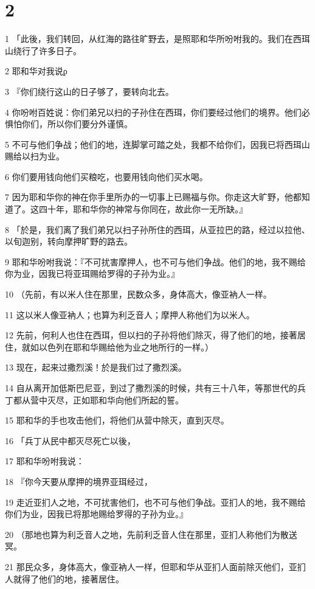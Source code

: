 \chapter{2}

\par 1 「此後，我们转回，从红海的路往旷野去，是照耶和华所吩咐我的。我们在西珥山绕行了许多日子。
\par 2 耶和华对我说ϼ
\par 3 『你们绕行这山的日子够了，要转向北去。
\par 4 你吩咐百姓说：你们弟兄以扫的子孙住在西珥，你们要经过他们的境界。他们必惧怕你们，所以你们要分外谨慎。
\par 5 不可与他们争战；他们的地，连脚掌可踏之处，我都不给你们，因我已将西珥山赐给以扫为业。
\par 6 你们要用钱向他们买粮吃，也要用钱向他们买水喝。
\par 7 因为耶和华你的神在你手里所办的一切事上已赐福与你。你走这大旷野，他都知道了。这四十年，耶和华你的神常与你同在，故此你一无所缺。』
\par 8 「於是，我们离了我们弟兄以扫子孙所住的西珥，从亚拉巴的路，经过以拉他、以旬迦别，转向摩押旷野的路去。
\par 9 耶和华吩咐我说：『不可扰害摩押人，也不可与他们争战。他们的地，我不赐给你为业，因我已将亚珥赐给罗得的子孙为业。』
\par 10 （先前，有以米人住在那里，民数众多，身体高大，像亚衲人一样。
\par 11 这以米人像亚衲人；也算为利乏音人；摩押人称他们为以米人。
\par 12 先前，何利人也住在西珥，但以扫的子孙将他们除灭，得了他们的地，接著居住，就如以色列在耶和华赐给他为业之地所行的一样。）
\par 13 现在，起来过撒烈溪！於是我们过了撒烈溪。
\par 14 自从离开加低斯巴尼亚，到过了撒烈溪的时候，共有三十八年，等那世代的兵丁都从营中灭尽，正如耶和华向他们所起的誓。
\par 15 耶和华的手也攻击他们，将他们从营中除灭，直到灭尽。
\par 16 「兵丁从民中都灭尽死亡以後，
\par 17 耶和华吩咐我说：
\par 18 『你今天要从摩押的境界亚珥经过，
\par 19 走近亚扪人之地，不可扰害他们，也不可与他们争战。亚扪人的地，我不赐给你们为业，因我已将那地赐给罗得的子孙为业。』
\par 20 （那地也算为利乏音人之地，先前利乏音人住在那里，亚扪人称他们为散送冥。
\par 21 那民众多，身体高大，像亚衲人一样，但耶和华从亚扪人面前除灭他们，亚扪人就得了他们的地，接著居住。
